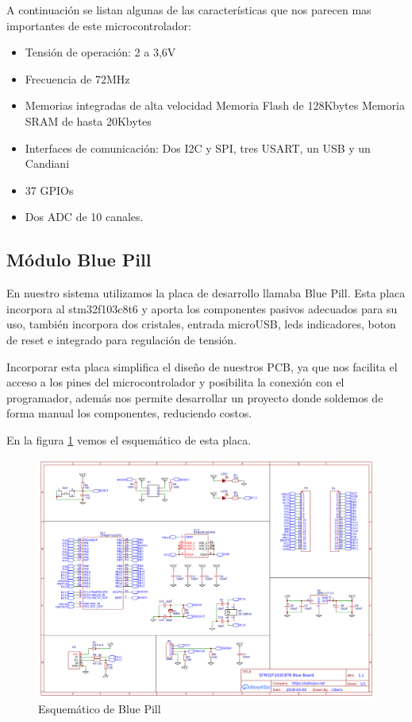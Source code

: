 A continuación se listan algunas de las características que nos parecen mas importantes de este microcontrolador:

\begin{itemize}
    \item Tensión de operación: 2 a 3,6V
    \item Frecuencia de 72MHz
    \item Memorias integradas de alta velocidad
    \subitem Memoria Flash de 128Kbytes
    \subitem Memoria SRAM de hasta 20Kbytes
    \item Interfaces de comunicación: Dos I2C y SPI, tres USART, un USB y un Candiani
    \item 37 GPIOs
    \item Dos ADC de 10 canales.
\end{itemize}

\subsection{Módulo Blue Pill} \label{cap:bluepill}

En nuestro sistema utilizamos la placa de desarrollo llamaba Blue Pill. Esta placa incorpora al stm32f103c8t6 y aporta los componentes pasivos
adecuados para su uso, también incorpora dos cristales, entrada microUSB, leds indicadores, boton de reset e integrado para regulación de tensión. \par
Incorporar esta placa simplifica el diseño de nuestros PCB, ya que nos facilita el acceso a los pines del microcontrolador y posibilita la conexión
con el programador, además nos permite desarrollar un proyecto donde soldemos de forma manual los componentes, reduciendo costos.\par
En la figura \ref{fig:sch_bluepill} vemos el esquemático de esta placa.

\begin{figure}[htb]
	\centering
	\includegraphics[scale=0.4]{images/esquematico_bluepill.png}
    \caption{Esquemático de Blue Pill}
	\label{fig:sch_bluepill}
\end{figure}
